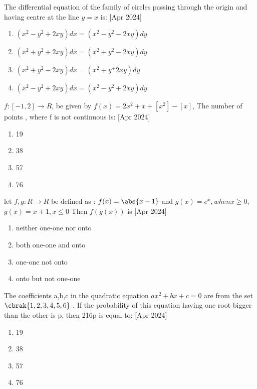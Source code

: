     \item The differential equation of the family of circles passing through the origin and having centre at the line $y=x$ is:
     \hfill{[Apr 2024]}
    \begin{multicols}{2}
            \begin{enumerate}
             \item $(x^2-y^2+2xy)dx=(x^2-y^2-2xy)dy$
              \item $(x^2+y^2+2xy)dx=(x^2+y^2-2xy)dy$
               \item $(x^2+y^2-2xy)dx=(x^2+y^+2xy)dy$
                \item $(x^2-y^2+2xy)dx=(x^2-y^2+2xy)dy$
            \end{enumerate}
        \end{multicols}
    \item $f:[-1,2]\rightarrow R$, be given by $f(x)=2x^2+x+[x^2]-[x]$, The number of points , where f is  not continuous is:
      \hfill{[Apr 2024]}
    \begin{multicols}{4}
            \begin{enumerate}

              \item 19
              \item 38
              \item 57
              \item 76
            \end{enumerate}
        \end{multicols}

    \item let $f,g: R\rightarrow R $ be defined as : $f(x)=\abs{x-1}$ and $g(x)=e^x, when x\geq 0$,$g(x)=x+1, x\leq 0$ Then $f(g(x))$ is
     \hfill{[Apr 2024]}
    \begin{multicols}{2}
            \begin{enumerate}
              \item neither one-one nor onto
              \item both one-one and onto
              \item one-one not onto
              \item onto but not one-one
            \end{enumerate}
        \end{multicols}
        \item The coefficients a,b,c in the quadratic equation $ax^2+bx+c=0$ are from the set $\cbrak{1,2,3,4,5,6}$ . If the probability of this equation having one root bigger than the other is p, then 216p is equal to:
         \hfill{[Apr 2024]}
        \begin{multicols}{4}
            \begin{enumerate}
              \item 19
              \item  38
              \item 57
              \item 76
            \end{enumerate}
        \end{multicols}
